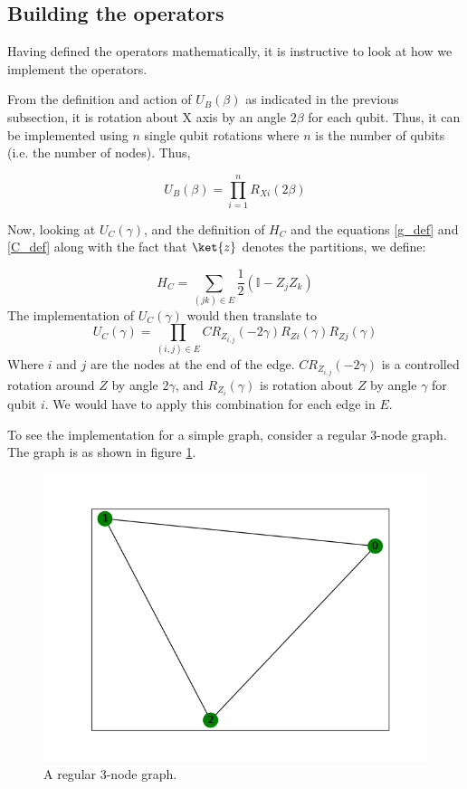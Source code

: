 \subsection{Building the operators}
Having defined the operators mathematically, it is instructive to look at how we implement the operators.

From the definition and action of $U_B(\beta)$ as indicated in the previous subsection, it is rotation about X axis by an angle $2\beta$ for each qubit. Thus, it can be implemented using $n$ single qubit rotations where $n$ is the number of qubits (i.e. the number of nodes). Thus,

$$U_B(\beta)=\prod_{i=1}^{n} R_{Xi}(2\beta)$$

Now, looking at $U_C(\gamma)$, and the definition of $H_C$ and the equations \ref{g_def} and \ref{C_def} along with the fact that $\ket{z}$ denotes the partitions, we define:

$$H_C = \sum_{(jk) \in E} \frac{1}{2}(\mathbb{I}- Z_j Z_k)$$
The implementation of $U_C(\gamma)$ would then translate to
\[U_C (\gamma) = \prod_{(i,j) \in E} CR_Z_{i,j}(-2\gamma)R_{Zi}(\gamma)R_{Zj}(\gamma)\]
Where $i$ and $j$ are the nodes at the end of the edge. $CR_Z_{i,j}(-2\gamma)$ is a controlled rotation around $Z$ by angle $2\gamma$, and $R_Z_{i}(\gamma)$ is rotation about $Z$ by angle $\gamma$ for qubit $i$. We would have to apply this combination for each edge in $E$.

To see the implementation for a simple graph, consider a regular 3-node graph. The graph is as shown in figure \ref{fig:triangle}.

\begin{figure}[h]
    \centering
    \includegraphics[scale=0.5]{images/triangle.png}
    \caption{A regular 3-node graph.}
    \label{fig:triangle}
\end{figure}

